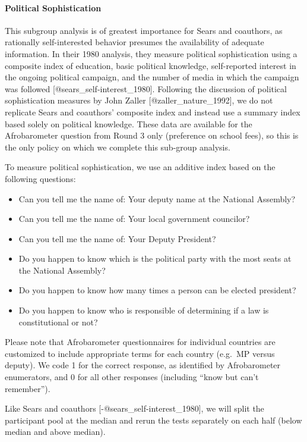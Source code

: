 \documentclass[]{article}
\let\oldparagraph\paragraph
\renewcommand{\paragraph}[1]{\oldparagraph{#1}\mbox{}}
\begin{document}
\paragraph{Political Sophistication}\label{political-sophistication}

This subgroup analysis is of greatest importance for Sears and
coauthors, as rationally self-interested behavior presumes the
availability of adequate information. In their 1980 analysis, they
measure political sophistication using a composite index of education,
basic political knowledge, self-reported interest in the ongoing
political campaign, and the number of media in which the campaign was
followed {[}@sears\_self-interest\_1980{]}. Following the discussion of
political sophistication measures by John Zaller
{[}@zaller\_nature\_1992{]}, we do not replicate Sears and coauthors'
composite index and instead use a summary index based solely on
political knowledge. These data are available for the Afrobarometer
question from Round 3 only (preference on school fees), so this is the
only policy on which we complete this sub-group analysis.

To measure political sophistication, we use an additive index based on
the following questions:

\begin{itemize}
  \item Can you tell me the name of: Your deputy name at the National Assembly?
  \item Can you tell me the name of: Your local government councilor?
  \item Can you tell me the name of: Your Deputy President?
  \item Do you happen to know which is the political party with the most seats at the National Assembly?
  \item Do you happen to know how many times a person can be elected president?
  \item Do you happen to know who is responsible of determining if a law is constitutional or not?
\end{itemize}

Please note that Afrobarometer questionnaires for individual countries
are customized to include appropriate terms for each country (e.g.~MP
versus deputy). We code 1 for the correct response, as identified by
Afrobarometer enumerators, and 0 for all other responses (including
``know but can't remember'').

Like Sears and coauthors {[}-@sears\_self-interest\_1980{]}, we will
split the participant pool at the median and rerun the tests separately
on each half (below median and above median).
\end{document}
